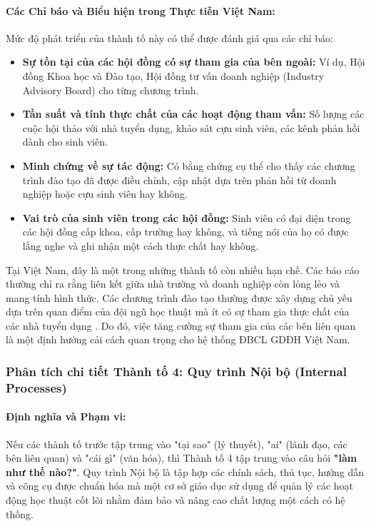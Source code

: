 \documentclass[12pt, a4paper, openany]{report}
\begin{document}
\paragraph{Các Chỉ báo và Biểu hiện trong Thực tiễn Việt Nam:}
Mức độ phát triển của thành tố này có thể được đánh giá qua các chỉ báo:
\begin{itemize}
    \item \textbf{Sự tồn tại của các hội đồng có sự tham gia của bên ngoài:} Ví dụ, Hội đồng Khoa học và Đào tạo, Hội đồng tư vấn doanh nghiệp (Industry Advisory Board) cho từng chương trình.
    \item \textbf{Tần suất và tính thực chất của các hoạt động tham vấn:} Số lượng các cuộc hội thảo với nhà tuyển dụng, khảo sát cựu sinh viên, các kênh phản hồi dành cho sinh viên.
    \item \textbf{Minh chứng về sự tác động:} Có bằng chứng cụ thể cho thấy các chương trình đào tạo đã được điều chỉnh, cập nhật dựa trên phản hồi từ doanh nghiệp hoặc cựu sinh viên hay không.
    \item \textbf{Vai trò của sinh viên trong các hội đồng:} Sinh viên có đại diện trong các hội đồng cấp khoa, cấp trường hay không, và tiếng nói của họ có được lắng nghe và ghi nhận một cách thực chất hay không.
\end{itemize}
Tại Việt Nam, đây là một trong những thành tố còn nhiều hạn chế. Các báo cáo thường chỉ ra rằng liên kết giữa nhà trường và doanh nghiệp còn lỏng lẻo và mang tính hình thức. Các chương trình đào tạo thường được xây dựng chủ yếu dựa trên quan điểm của đội ngũ học thuật mà ít có sự tham gia thực chất của các nhà tuyển dụng \cite{CommonFailureCriteria}. Do đó, việc tăng cường sự tham gia của các bên liên quan là một định hướng cải cách quan trọng cho hệ thống ĐBCL GDĐH Việt Nam.



\subsubsection{Phân tích chi tiết Thành tố 4: Quy trình Nội bộ (Internal Processes)}
\label{subsubsec:thanh_to_4}

\paragraph{Định nghĩa và Phạm vi:}
Nếu các thành tố trước tập trung vào "tại sao" (lý thuyết), "ai" (lãnh đạo, các bên liên quan) và "cái gì" (văn hóa), thì Thành tố 4 tập trung vào câu hỏi \textbf{"làm như thế nào?"}. Quy trình Nội bộ là tập hợp các chính sách, thủ tục, hướng dẫn và công cụ được chuẩn hóa mà một cơ sở giáo dục sử dụng để quản lý các hoạt động học thuật cốt lõi nhằm đảm bảo và nâng cao chất lượng một cách có hệ thống.
\end{document}
